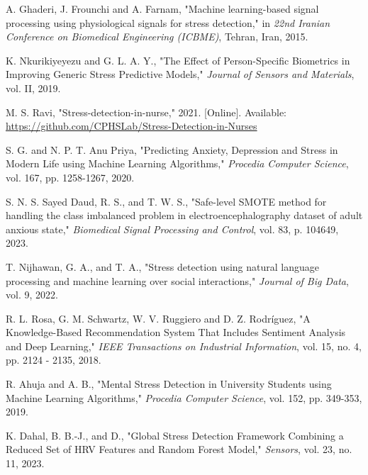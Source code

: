 \documentclass{article}
\begin{document}

\begin{thebibliography}{}
A. Ghaderi, J. Frounchi and A. Farnam, "Machine learning-based signal processing using physiological signals for stress detection," in \textit{22nd Iranian Conference on Biomedical Engineering (ICBME)}, Tehran, Iran, 2015.

K. Nkurikiyeyezu and G. L. A. Y., "The Effect of Person-Specific Biometrics in Improving Generic Stress Predictive Models," \textit{Journal of Sensors and Materials}, vol. II, 2019.

M. S. Ravi, "Stress-detection-in-nurse," 2021. [Online]. Available: \url{https://github.com/CPHSLab/Stress-Detection-in-Nurses}

S. G. and N. P. T. Anu Priya, "Predicting Anxiety, Depression and Stress in Modern Life using Machine Learning Algorithms," \textit{Procedia Computer Science}, vol. 167, pp. 1258-1267, 2020.

S. N. S. Sayed Daud, R. S., and T. W. S., "Safe-level SMOTE method for handling the class imbalanced problem in electroencephalography dataset of adult anxious state," \textit{Biomedical Signal Processing and Control}, vol. 83, p. 104649, 2023.

T. Nijhawan, G. A., and T. A., "Stress detection using natural language processing and machine learning over social interactions," \textit{Journal of Big Data}, vol. 9, 2022.

R. L. Rosa, G. M. Schwartz, W. V. Ruggiero and D. Z. Rodríguez, "A Knowledge-Based Recommendation System That Includes Sentiment Analysis and Deep Learning," \textit{IEEE Transactions on Industrial Information}, vol. 15, no. 4, pp. 2124 - 2135, 2018.

R. Ahuja and A. B., "Mental Stress Detection in University Students using Machine Learning Algorithms," \textit{Procedia Computer Science}, vol. 152, pp. 349-353, 2019.

K. Dahal, B. B.-J., and D., "Global Stress Detection Framework Combining a Reduced Set of HRV Features and Random Forest Model," \textit{Sensors}, vol. 23, no. 11, 2023.


\end{thebibliography}
\end{document}
